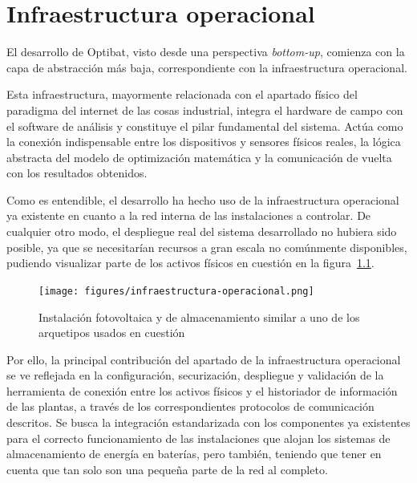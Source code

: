 \chapter{Infraestructura operacional}
\label{makereference3}

El desarrollo de Optibat, visto desde una perspectiva \textit{bottom-up}, comienza con la capa de abstracción más baja, correspondiente con la infraestructura operacional.

Esta infraestructura, mayormente relacionada con el apartado físico del paradigma del internet de las cosas industrial, integra el hardware de campo con el software de análisis y constituye el pilar fundamental del sistema. Actúa como la conexión indispensable entre los dispositivos y sensores físicos reales, la lógica abstracta del modelo de optimización matemática y la comunicación de vuelta con los resultados obtenidos.

Como es entendible, el desarrollo ha hecho uso de la infraestructura operacional ya existente en cuanto a la red interna de las instalaciones a controlar. De cualquier otro modo, el despliegue real del sistema desarrollado no hubiera sido posible, ya que se necesitarían recursos a gran escala no comúnmente disponibles, pudiendo visualizar parte de los activos físicos en cuestión en la figura~\ref{fig:infraestructura-operacional}.

\begin{figure}
\centering
\texttt{[image: figures/infraestructura-operacional.png]}
\caption{Instalación fotovoltaica y de almacenamiento similar a uno de los arquetipos usados en cuestión}
\label{fig:infraestructura-operacional}
\end{figure}

Por ello, la principal contribución del apartado de la infraestructura operacional se ve reflejada en la configuración, securización, despliegue y validación de la herramienta de conexión entre los activos físicos y el historiador de información de las plantas, a través de los correspondientes protocolos de comunicación descritos. Se busca la integración estandarizada con los componentes ya existentes para el correcto funcionamiento de las instalaciones que alojan los sistemas de almacenamiento de energía en baterías, pero también, teniendo que tener en cuenta que tan solo son una pequeña parte de la red al completo.

